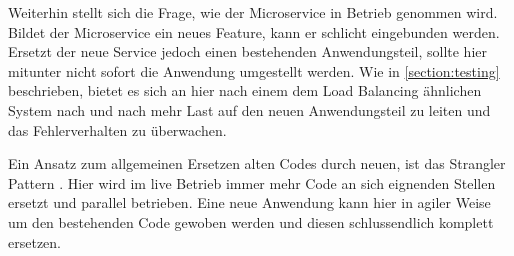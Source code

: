 Weiterhin stellt sich die Frage, wie der Microservice in Betrieb genommen wird. Bildet der Microservice ein neues Feature, kann er schlicht eingebunden werden. Ersetzt der neue Service jedoch einen bestehenden Anwendungsteil, sollte hier mitunter nicht sofort die Anwendung umgestellt werden. Wie in \autoref{section:testing} beschrieben, bietet es sich an hier nach einem dem Load Balancing ähnlichen System nach und nach mehr Last auf den neuen Anwendungsteil zu leiten und das Fehlerverhalten zu überwachen.

Ein Ansatz zum allgemeinen Ersetzen alten Codes durch neuen, ist das Strangler Pattern \cite[][]{Fowler:Strangler}. Hier wird im live Betrieb immer mehr Code an sich eignenden Stellen ersetzt und parallel betrieben. Eine neue Anwendung kann hier in agiler Weise um den bestehenden Code gewoben werden und diesen schlussendlich komplett ersetzen.
